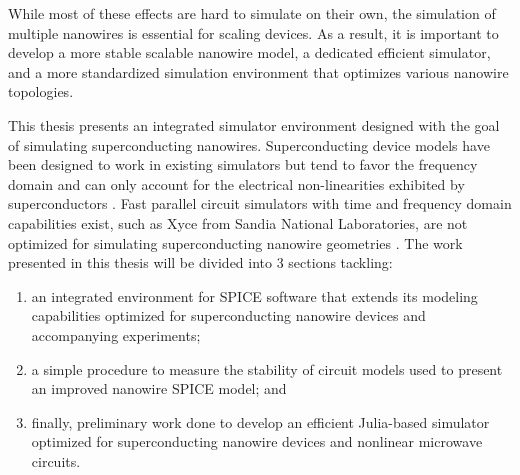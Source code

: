 While most of these effects are hard to simulate on their own, the simulation of multiple nanowires
is essential for scaling devices. As a result, it is important to develop 
a more stable scalable nanowire model, a dedicated efficient simulator, and a more standardized 
simulation environment that optimizes various nanowire topologies.

This thesis presents an integrated simulator environment designed with the goal of simulating
superconducting nanowires. Superconducting device
models have been designed to work in existing simulators
but tend to favor the frequency domain and can  
only account for 
the electrical non-linearities exhibited by superconductors \cite{josephsoncircsjl, wrspice}. 
Fast parallel circuit simulators with time and frequency domain capabilities
exist, such as Xyce from Sandia National Laboratories, are not optimized
for simulating superconducting nanowire geometries \cite{xyce_reference}.
The work presented in this thesis will be divided into 3 sections tackling: 
\begin{enumerate}
    \item an integrated environment for SPICE software that extends its modeling capabilities
    optimized for superconducting nanowire devices and accompanying experiments;
    \item a simple procedure to measure the stability of circuit models used to 
    present an improved nanowire SPICE model; and
    \item finally, preliminary work done to develop an efficient Julia-based simulator
    optimized for superconducting nanowire devices and nonlinear microwave circuits.
\end{enumerate}




